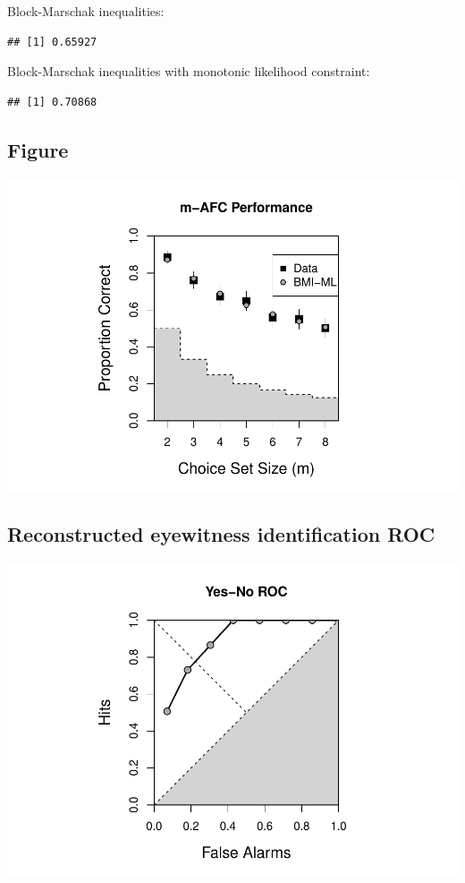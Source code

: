 \documentclass[]{article}
\begin{document}
Block-Marschak inequalities:

\begin{verbatim}
## [1] 0.65927
\end{verbatim}

Block-Marschak inequalities with monotonic likelihood constraint:

\begin{verbatim}
## [1] 0.70868
\end{verbatim}

\subsection{Figure}\label{figure}

\includegraphics{b_m_output_files/figure-latex/unnamed-chunk-13-1.pdf}

\subsection{Reconstructed eyewitness identification
ROC}\label{reconstructed-eyewitness-identification-roc}

\includegraphics{b_m_output_files/figure-latex/unnamed-chunk-14-1.pdf}
\end{document}

